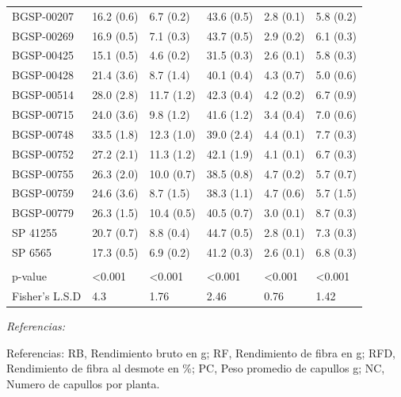 \documentclass[12pt,oneside]{reedthesis}
\begin{document}
\begin{table}[!h]
{\begin{threeparttable}
\begin{tabular}[t]{llllll}
BGSP-00207 & 16.2 (0.6) & 6.7 (0.2) & 43.6 (0.5) & 2.8 (0.1) & 5.8 (0.2)\\
\addlinespace
BGSP-00269 & 16.9 (0.5) & 7.1 (0.3) & 43.7 (0.5) & 2.9 (0.2) & 6.1 (0.3)\\
BGSP-00425 & 15.1 (0.5) & 4.6 (0.2) & 31.5 (0.3) & 2.6 (0.1) & 5.8 (0.3)\\
BGSP-00428 & 21.4 (3.6) & 8.7 (1.4) & 40.1 (0.4) & 4.3 (0.7) & 5.0 (0.6)\\
BGSP-00514 & 28.0 (2.8) & 11.7 (1.2) & 42.3 (0.4) & 4.2 (0.2) & 6.7 (0.9)\\
BGSP-00715 & 24.0 (3.6) & 9.8 (1.2) & 41.6 (1.2) & 3.4 (0.4) & 7.0 (0.6)\\
\addlinespace
BGSP-00748 & 33.5 (1.8) & 12.3 (1.0) & 39.0 (2.4) & 4.4 (0.1) & 7.7 (0.3)\\
BGSP-00752 & 27.2 (2.1) & 11.3 (1.2) & 42.1 (1.9) & 4.1 (0.1) & 6.7 (0.3)\\
BGSP-00755 & 26.3 (2.0) & 10.0 (0.7) & 38.5 (0.8) & 4.7 (0.2) & 5.7 (0.7)\\
BGSP-00759 & 24.6 (3.6) & 8.7 (1.5) & 38.3 (1.1) & 4.7 (0.6) & 5.7 (1.5)\\
BGSP-00779 & 26.3 (1.5) & 10.4 (0.5) & 40.5 (0.7) & 3.0 (0.1) & 8.7 (0.3)\\
\addlinespace
SP 41255 & 20.7 (0.7) & 8.8 (0.4) & 44.7 (0.5) & 2.8 (0.1) & 7.3 (0.3)\\
SP 6565 & 17.3 (0.5) & 6.9 (0.2) & 41.2 (0.3) & 2.6 (0.1) & 6.8 (0.3)\\
 &  &  &  &  & \\
p-value & <0.001 & <0.001 & <0.001 & <0.001 & <0.001\\
Fisher’s L.S.D & 4.3 & 1.76 & 2.46 & 0.76 & 1.42\\
\bottomrule
\end{tabular}
\begin{tablenotes}[para]
\item \textit{Referencias:} 
\item Referencias: RB, Rendimiento bruto en g; RF, Rendimiento de fibra en g; RFD, Rendimiento de fibra al desmote en \%; PC, Peso promedio de capullos g; NC, Numero de capullos por planta.
\end{tablenotes}
\end{threeparttable}}
\end{table}
\end{document}

